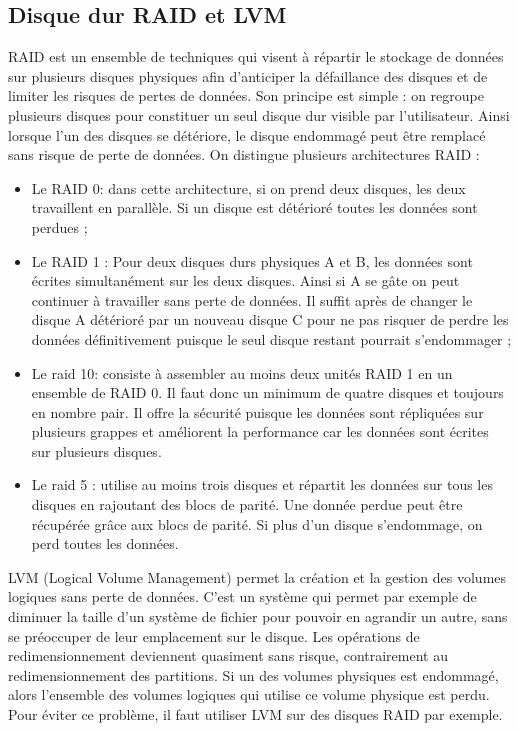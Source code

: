 \documentclass[a4paper,12pt,french]{report} %
\begin{document}
\subsection{Disque dur RAID et LVM}
RAID est un ensemble de techniques qui visent à répartir le stockage de données sur plusieurs disques physiques afin d'anticiper la défaillance des disques et de limiter les risques de pertes de données. Son principe est simple : on regroupe plusieurs disques pour constituer un seul disque dur visible par l'utilisateur. Ainsi lorsque l'un des disques se détériore, le disque endommagé peut être remplacé sans risque de perte de données. On distingue plusieurs architectures RAID :
\begin{itemize}
	\item Le RAID 0: dans cette architecture, si on prend deux disques, les deux travaillent en parallèle. Si un disque est détérioré toutes les données sont perdues ;
	\item Le RAID 1 : Pour deux disques durs physiques A et B, les données sont écrites simultanément sur les deux disques. Ainsi si A se gâte on peut continuer à travailler sans perte de données. Il suffit après de changer le disque A détérioré par un nouveau disque C pour ne pas risquer de perdre les données définitivement puisque le seul disque restant pourrait s'endommager ;
	\item Le raid 10: consiste à assembler au moins deux unités RAID 1 en un ensemble de RAID 0. Il faut donc un minimum de quatre disques et toujours en nombre pair. Il offre la sécurité puisque les données sont répliquées sur plusieurs grappes et améliorent la performance car les données sont écrites sur plusieurs disques.%
	\item Le raid 5 : utilise au moins trois disques et répartit les données sur tous les disques en rajoutant des blocs de parité. Une donnée perdue peut être récupérée grâce aux blocs de parité. Si plus d'un disque s'endommage, on perd toutes les données. 
\end{itemize}

LVM (Logical Volume Management) permet la création et la gestion des volumes logiques sans perte de données. C'est un système qui permet par exemple de diminuer la taille d'un système de fichier pour pouvoir en agrandir un autre, sans se préoccuper de leur emplacement sur le disque. Les opérations de redimensionnement deviennent quasiment sans risque, contrairement au redimensionnement des partitions. Si un des volumes physiques est endommagé, alors l'ensemble des volumes logiques qui utilise ce volume physique est perdu. Pour éviter ce problème, il faut utiliser LVM sur des disques RAID par exemple.
\end{document}
